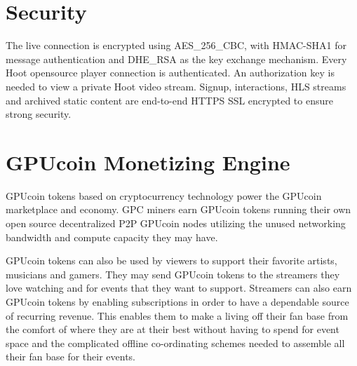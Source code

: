 \documentclass{article}
\begin{document}




\section{Security}
The live connection is encrypted using AES\_256\_CBC, with HMAC-SHA1 for message authentication and DHE\_RSA as the key exchange mechanism. Every Hoot opensource player connection is authenticated.
An authorization key is needed to view a private Hoot video stream. Signup, interactions, HLS streams and archived static content are end-to-end HTTPS SSL encrypted to ensure strong security. 

\section{GPUcoin Monetizing Engine}
GPUcoin tokens based on cryptocurrency technology power the GPUcoin marketplace and economy. GPC miners earn GPUcoin tokens running their own open source decentralized P2P GPUcoin nodes utilizing the unused networking bandwidth and compute capacity they may have. 

 GPUcoin tokens can also be used by viewers to support their favorite artists, musicians and gamers. They may send GPUcoin tokens to the streamers they love watching and for events that they want to support. Streamers can also earn GPUcoin tokens by enabling subscriptions in order to have a dependable source of recurring revenue. This enables them to make a living off their fan base from the comfort of where they are at their best without having to spend for event space and the complicated offline co-ordinating schemes needed to assemble all their fan base for their events.
\end{document}
